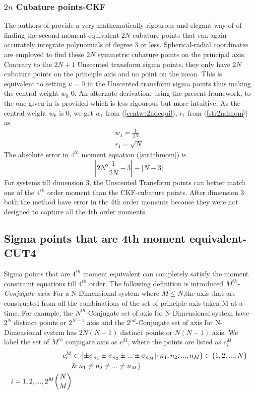\documentclass[letterpaper, 10 pt, conference]{ieeeconf}  %
\begin{document}
\subsubsection{$2n$ Cubature points-CKF}
The authors of \cite{c9} provide a very mathematically rigourous and elegant way of of finding the second moment equivalent $2N$ cubature points that can again accurately integrate polynomials of degree 3 or less. Spherical-radial coordinates are employed to find these $2N$ symmetric cubature points on the principal axis. Contrary to the $2N+1$ Unscented transform sigma points, they only have $2N$ cubature  points on the principle axis and no point on the mean. This is equivalent to setting $\kappa=0$ in the Unscented transform sigma points thus making the central weight $w_0$ 0. An alternate derivation, using the present framework, to the one given in \cite{c2} is provided which is less rigourous but more intuitive. As the central weight $w_0$ is 0, we get $w_1$ from (\ref{centwt2ndequi}), $r_1$ from (\ref{str2ndmom}) as
\setlength{\arraycolsep}{0.0em}
\begin{eqnarray}
w_1=\frac{1}{2N}\\
r_1=\sqrt{N}
\end{eqnarray}
\setlength{\arraycolsep}{5pt}    
The absolute error in $4^{th}$ moment equation (\ref{str4thmom}) is
\begin{equation}
|2N^2\frac{1}{2N}-3|\equiv |N-3|
\end{equation} 
For systems till dimension 3, the Unscented Transform points can better match one of the $4^{th}$ order moment than the CKF-cubature points. After dimension 3 both the method have error in the 4th order moments because they were not designed to capture all the 4th order moments.

\subsection{Sigma points that are 4th moment equivalent-CUT4}
Sigma points that are $4^{th}$ moment equivalent can completely satisfy the moment constraint equations till $4^{th}$ order. The following definition is introduced \newline 
\emph{$M^{th}$-Conjugate axis}: For a N-Dimensional system where $M\le N$,the axis that are constructed from all the combinations of the set of principle axis taken M at a time. For example, the $N^{th}$-Conjugate set of axis for N-Dimensional system have $2^N$ distinct points or $2^{N-1}$ axis and the $2^{nd}$-Conjugate set of axis for N-Dimensional system has $2N(N-1)$ distinct points or $N(N-1)$ axis. We label the set of $M^{th}$ conjugate axis as  $c^M$, where the points are listed as $c^M_i$
\setlength{\arraycolsep}{0.0em}
\begin{eqnarray} 
c^M_i & \in\{\pm\sigma_{n_1}\pm\sigma_{n_2} \pm ...\pm \sigma_{n_M}|\{n_1,n_2,...,n_M\}\in \{1,2,...,N\}\\
& \&\: n_1\ne n_2\ne...\ne n_M \}\\
i=1,2,...,2^M\dbinom{N}{M} 
\end{eqnarray}
\setlength{\arraycolsep}{5pt}
\end{document}
